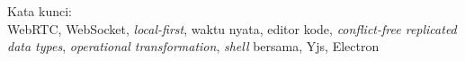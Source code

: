 \vspace*{0.2cm}

\noindent Kata kunci: \\ WebRTC, WebSocket, \textit{local-first}, waktu nyata, editor kode, \textit{conflict-free replicated data types}, \textit{operational transformation}, \textit{shell} bersama, Yjs, Electron \\

\newpage
